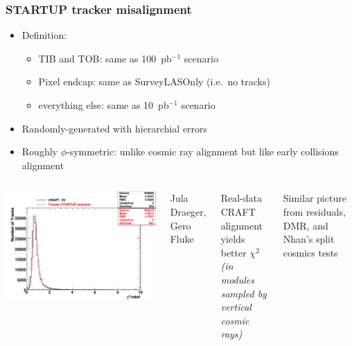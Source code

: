 \documentclass[compress]{beamer}
\begin{document}
\begin{frame}
\frametitle{STARTUP tracker misalignment}

\begin{itemize}\setlength{\itemsep}{0.1 cm}
\item Definition:
\begin{itemize}
\item TIB and TOB: same as 100~pb$^{-1}$ scenario
\item Pixel endcap: same as SurveyLASOnly (i.e.~no tracks)
\item everything else: same as 10~pb$^{-1}$ scenario
\end{itemize}

\item Randomly-generated with hierarchial errors

\item Roughly $\phi$-symmetric: unlike cosmic ray alignment but like early collisions alignment
\end{itemize}

\begin{columns}
\includegraphics[width=\linewidth]{tracker_chi2.pdf}

Jula Draeger, Gero Fluke

\vspace{0.4 cm}
Real-data CRAFT alignment yields better $\chi^2$ \\ {\it (in modules sampled by vertical cosmic rays)}

\vspace{0.4 cm}
Similar picture from residuals, DMR, and Nhan's split cosmics tests
\end{columns}
\end{frame}
\end{document}

